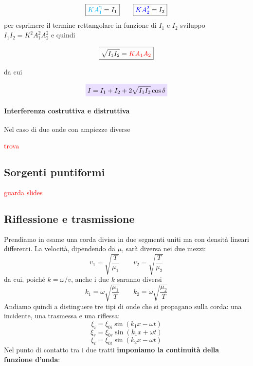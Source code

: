 \documentclass[x11names]{article}
\newcommand{\viola}[1]{\colorbox{myred}{$\displaystyle #1$}}
\begin{document}
		\[ 
		\boxed{\textcolor{cyan}{KA_1^2}= I_1} \qquad \boxed{\textcolor{blue}{KA_2^2} = I_2 } 
		\]
		per esprimere il termine rettangolare in funzione di \(I_1\) e \(I_2\) sviluppo \(I_1I_2 = K^2A_1^2A_2^2\) e quindi
		
		\[ 
		\boxed{\sqrt{I_1I_2} = \textcolor{red}{KA_1A_2}}
		\]
		
		da cui
		
		\begin{equation}
			\viola{I = I_1 + I_2 + 2\sqrt{I_1I_2}\cos\delta}
		\end{equation}
		
		
		\begin{es}{}
			\paragraph{Interferenza costruttiva e distruttiva}
			Nel caso di due onde con ampiezze diverse 
			\begin{center}
				\textcolor{red}{trova}
			\end{center}
			
		\end{es}
		
		
		\subsection{Sorgenti puntiformi}
			\begin{center}
				\textcolor{red}{guarda slides}
			\end{center}
			
		\newpage
		\subsection{Riflessione e trasmissione}
		Prendiamo in esame una corda divisa in due segmenti uniti ma con densità lineari differenti. La velocità, dipendendo da \(\mu\), sarà diversa nei due mezzi:
		\[ 
		v_1 = \sqrt{\frac{T}{\mu_1}} \qquad v_2 = \sqrt{\frac{T}{\mu_2}} 
		\]
		da cui, poiché \(k = \omega / v\), anche i due \(k\) saranno diversi
		\[ 
		k_1 = \omega \sqrt{\frac{\mu_1}{T}} \qquad k_2 = \omega \sqrt{\frac{\mu_2}{T}} 
		\]
		Andiamo quindi a distinguere tre tipi di onde che si propagano sulla corda: una incidente, una trasmessa e una riflessa:
		\[ 
		\xi_i = \xi_{0i}\sin\left(k_1 x - \omega t\right)
		\]
		\[ 
		\xi_r = \xi_{0r}\sin\left(k_1 x + \omega t\right)
		\]
		\[ 
		\xi_t = \xi_{0t}\sin\left(k_2 x - \omega t\right)
		\]
		Nel punto di contatto tra i due tratti \textbf{imponiamo la continuità della funzione d'onda}:
		
\end{document}
